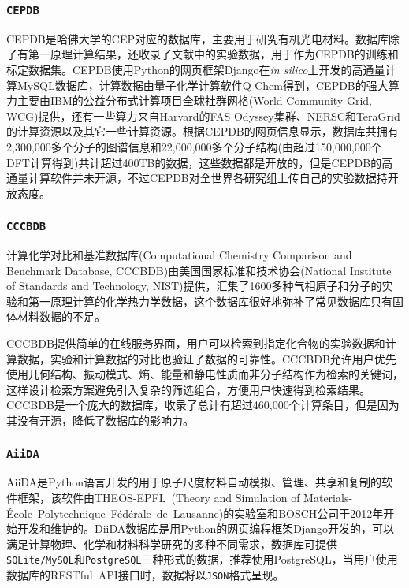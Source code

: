 \frame
{
\frametitle{\tt{CEPDB}}
\textrm{CEPDB}是哈佛大学的\textrm{CEP}对应的数据库，主要用于研究有机光电材料\cite{CEPDB_URL,JPCL2-2241_2011}。数据库除了有第一原理计算结果，还收录了文献中的实验数据，用于作为\textrm{CEPDB}的训练和标定数据集。\textrm{CEPDB}使用\textrm{Python}的网页框架\textrm{Django}在\textit{in silico}上开发的高通量计算\textrm{MySQL}数据库，计算数据由量子化学计算软件\textrm{Q-Chem}得到，\textrm{CEPDB}的强大算力主要由\textrm{IBM}的公益分布式计算项目全球社群网格\textrm{(World Community Grid, WCG)}提供，还有一些算力来自\textrm{Harvard}的\textrm{FAS Odyssey}集群、\textrm{NERSC}和\textrm{TeraGrid}的计算资源以及其它一些计算资源。根据\textrm{CEPDB}的网页信息显示，数据库共拥有2,300,000多个分子的图谱信息和22,000,000多个分子结构(由超过150,000,000个\textrm{DFT}计算得到)共计超过400\textrm{TB}的数据，这些数据都是开放的，但是\textrm{CEPDB}的高通量计算软件并未开源，不过\textrm{CEPDB}对全世界各研究组上传自己的实验数据持开放态度。
}

\frame
{
\frametitle{\texttt{CCCBDB}}
计算化学对比和基准数据库\textrm{(Computational Chemistry Comparison and Benchmark Database, CCCBDB)}由美国国家标准和技术协会(\textrm{National Institute of Standards and Technology, NIST})提供，汇集了1600多种气相原子和分子的实验和第一原理计算的化学热力学数据\cite{CCCBDB}，这个数据库很好地弥补了常见数据库只有固体材料数据的不足。

\textrm{CCCBDB}提供简单的在线服务界面，用户可以检索到指定化合物的实验数据和计算数据，实验和计算数据的对比也验证了数据的可靠性。\textrm{CCCBDB}允许用户优先使用几何结构、振动模式、熵、能量和静电性质而非分子结构作为检索的关键词，这样设计检索方案避免引入复杂的筛选组合，方便用户快速得到检索结果。\textrm{CCCBDB}是一个庞大的数据库，收录了总计有超过460,000个计算条目，但是因为其没有开源，降低了数据库的影响力。
}

\frame
{
\frametitle{\tt{AiiDA}}
\textrm{AiiDA}\cite{AiiDA_URL}是\textrm{Python}语言开发的用于原子尺度材料自动模拟、管理、共享和复制的软件框架，该软件由\textrm{THEOS-EPFL~(Theory and Simulation of Materials-{\'E}cole~Polytechnique~F{\'e}d{\'e}rale~de~Lausanne)}的实验室和\textrm{BOSCH}公司于2012年开始开发和维护的。\textrm{DiiDA}数据库是用\textrm{Python}的网页编程框架\textrm{Django}开发的\cite{CMS187-110086_2021}，可以满足计算物理、化学和材料科学研究的多种不同需求，数据库可提供\texttt{SQLite/MySQL}和\texttt{PostgreSQL}三种形式的数据，推荐使用\textrm{PostgreSQL}，当用户使用数据库的\textrm{RESTful~API}接口时，数据将以\texttt{JSON}格式呈现。
}

